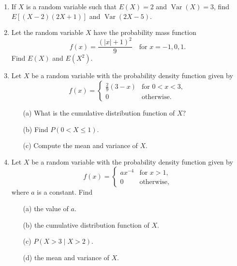 \documentclass[11pt]{article}
\newcommand{\ds}{\displaystyle}
\DeclareMathOperator{\var}{Var}
\begin{document}

\vspace{0.3cm}

\begin{enumerate}
\item
If $X$ is a random variable such that $E(X) = 2$ and $\var(X) = 3$, find $E[(X - 2)(2X + 1)]$ and $\var(2X - 5)$.

\item
Let the random variable $X$ have the probability mass function
$$
f(x) = \frac{(|x| + 1)^2}{9} \quad \mbox{for $x = -1, 0, 1$}.
$$ 
Find $E(X)$ and $E\left(X^2\right)$.

\item
Let $X$ be a random variable with the probability density function given by
$$
f(x) = \left\{\begin{array}{cl}
\ds \frac{2}{9}(3-x) & \mbox{for $0 < x < 3$}, \\
0 & \mbox{otherwise}.
\end{array}
\right.
$$
\begin{enumerate}
\item[(a)]
What is the cumulative distribution function of $X$?
\item[(b)]
Find $P(0 < X \leq 1)$.
\item[(c)]
Compute the mean and variance of $X$.
\end{enumerate}

\item
Let $X$ be a random variable with the probability density function given by
$$
f(x) = \left\{\begin{array}{cl}
a x^{-4} & \mbox{for $x > 1$}, \\
0 & \mbox{otherwise},
\end{array}
\right.
$$
where $a$ is a constant. Find
\begin{enumerate}
\item[(a)]
the value of $a$.
\item[(b)]
the cumulative distribution function of $X$.
\item[(c)]
$P(X > 3 \mid X > 2)$.
\item[(d)]
the mean and variance of $X$.
\end{enumerate}


\end{enumerate}
\end{document}
